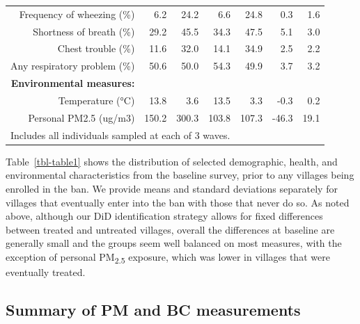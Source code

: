 \documentclass[
  letterpaper,
  DIV=11,
  numbers=noendperiod]{scrartcl}
\makeatletter
\renewenvironment{table}%
  {\renewcommand\familydefault\sfdefault
   \@float{table}}
  {\end@float}
\makeatother
\begin{document}
\begin{table}
\begin{tabular}[t]{rrrrrrr}
Frequency of wheezing (\%) & 6.2 & 24.2 & 6.6 & 24.8 & 0.3 & 1.6\\
Shortness of breath (\%) & 29.2 & 45.5 & 34.3 & 47.5 & 5.1 & 3.0\\
Chest trouble (\%) & 11.6 & 32.0 & 14.1 & 34.9 & 2.5 & 2.2\\
Any respiratory problem (\%) & 50.6 & 50.0 & 54.3 & 49.9 & 3.7 & 3.2\\
\textbf{Environmental measures:} & \textbf{} & \textbf{} & \textbf{} & \textbf{} & \textbf{} & \textbf{}\\
Temperature (°C) & 13.8 & 3.6 & 13.5 & 3.3 & -0.3 & 0.2\\
Personal PM2.5 (ug/m3) & 150.2 & 300.3 & 103.8 & 107.3 & -46.3 & 19.1\\
\bottomrule
\multicolumn{7}{l}{\rule{0pt}{1em}Includes all individuals sampled at each of 3 waves.}\\
\end{tabular}
\end{table}

Table~\ref{tbl-table1} shows the distribution of selected demographic,
health, and environmental characteristics from the baseline survey,
prior to any villages being enrolled in the ban. We provide means and
standard deviations separately for villages that eventually enter into
the ban with those that never do so. As noted above, although our DiD
identification strategy allows for fixed differences between treated and
untreated villages, overall the differences at baseline are generally
small and the groups seem well balanced on most measures, with the
exception of personal PM\textsubscript{2.5} exposure, which was lower in
villages that were eventually treated.

\hypertarget{summary-of-pm-and-bc-measurements}{%
\subsection{Summary of PM and BC
measurements}\label{summary-of-pm-and-bc-measurements}}
\end{document}
